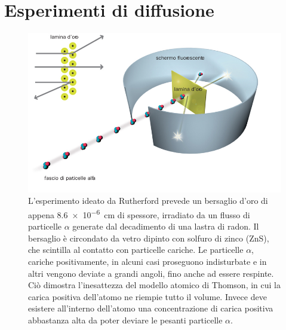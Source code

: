 \documentclass[../main.tex]{subfiles}
\begin{document}
\section{Esperimenti di diffusione}
\begin{figure}[b!]
    \centering
    \includegraphics[width=\textwidth]{rutherford.jpg}
    \caption{L'esperimento ideato da Rutherford prevede un bersaglio d'oro di appena \SI{8.6e-6}{\cm} di spessore, irradiato da un flusso di particelle $\alpha$ generate dal decadimento di una lastra di radon. Il bersaglio è circondato da vetro dipinto con solfuro di zinco (ZnS), che scintilla al contatto con particelle cariche. Le particelle $\alpha$, cariche positivamente, in alcuni casi proseguono indisturbate e in altri vengono deviate a grandi angoli, fino anche ad essere respinte. Ciò dimostra l'inesattezza del modello atomico di Thomson, in cui la carica positiva dell'atomo ne riempie tutto il volume. Invece deve esistere all'interno dell'atomo una concentrazione di carica positiva abbastanza alta da poter deviare le pesanti particelle $\alpha$. \cite{as9_acdm}}
    \label{fig:rutherford}
\end{figure}
\end{document}
